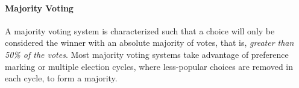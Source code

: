 %
%
%

\paragraph{Majority Voting}
A majority voting system is characterized such that a choice will only be
considered the winner with an absolute majority of votes, that is, \emph{greater
than 50\% of the votes}. Most majority voting systems take advantage of
preference marking or multiple election cycles, where less-popular choices are
removed in each cycle, to form a majority.

